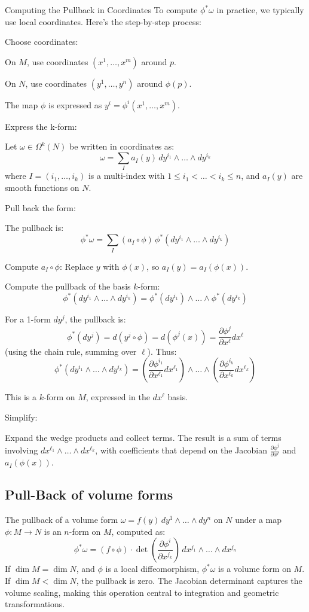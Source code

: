Computing the Pullback in Coordinates
To compute $ \phi^* \omega $ in practice, we typically use local coordinates. Here’s the step-by-step process:

Choose coordinates:

On $ M $, use coordinates $ (x^1, \dots, x^m) $ around $ p $.

On $ N $, use coordinates $ (y^1, \dots, y^n) $ around $ \phi(p) $.

The map $ \phi $ is expressed as $ y^i = \phi^i(x^1, \dots, x^m) $.

Express the k-form:

Let $ \omega \in \Omega^k(N) $ be written in coordinates as:
$$\omega = \sum_{I} a_I(y) \, dy^{i_1} \wedge \dots \wedge dy^{i_k}$$
where $ I = (i_1, \dots, i_k) $ is a multi-index with $ 1 \leq i_1 < \dots < i_k \leq n $, and $ a_I(y) $ are smooth functions on $ N $.


Pull back the form:

The pullback is:
$$\phi^* \omega = \sum_{I} (a_I \circ \phi) \, \phi^* (dy^{i_1} \wedge \dots \wedge dy^{i_k})$$

Compute $ a_I \circ \phi $: Replace $ y $ with $ \phi(x) $, so $ a_I(y) = a_I(\phi(x)) $.

Compute the pullback of the basis $ k $-form:
$$\phi^* (dy^{i_1} \wedge \dots \wedge dy^{i_k}) = \phi^* (dy^{i_1}) \wedge \dots \wedge \phi^* (dy^{i_k})$$

For a 1-form $ dy^j $, the pullback is:
$$\phi^* (dy^j) = d (y^j \circ \phi) = d (\phi^j(x)) = \frac{\partial \phi^j}{\partial x^\ell} dx^\ell$$
(using the chain rule, summing over $ \ell $).
Thus:
$$\phi^* (dy^{i_1} \wedge \dots \wedge dy^{i_k}) = \left( \frac{\partial \phi^{i_1}}{\partial x^{\ell_1}} dx^{\ell_1} \right) \wedge \dots \wedge \left( \frac{\partial \phi^{i_k}}{\partial x^{\ell_k}} dx^{\ell_k} \right)$$

This is a $ k $-form on $ M $, expressed in the $ dx^\ell $ basis.


Simplify:

Expand the wedge products and collect terms.
The result is a sum of terms involving $ dx^{\ell_1} \wedge \dots \wedge dx^{\ell_k} $, with coefficients that depend on the Jacobian $ \frac{\partial \phi^j}{\partial x^\ell} $ and $ a_I(\phi(x)) $.

\subsection{Pull-Back of volume forms}
The pullback of a volume form $ \omega = f(y) \, dy^1 \wedge \dots \wedge dy^n $ on $ N $ under a map $ \phi: M \to N $ is an $ n $-form on $ M $, computed as:
$$\phi^* \omega = (f \circ \phi) \cdot \det \left( \frac{\partial \phi^i}{\partial x^{j_k}} \right) \, dx^{j_1} \wedge \dots \wedge dx^{j_n}$$
If $ \dim M = \dim N $, and $ \phi $ is a local diffeomorphism, $ \phi^* \omega $ is a volume form on $ M $. If $ \dim M < \dim N $, the pullback is zero. The Jacobian determinant captures the volume scaling, making this operation central to integration and geometric transformations.
